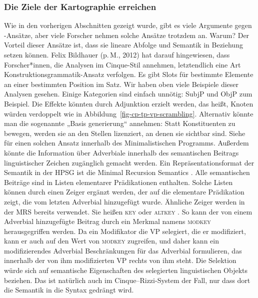 \subsubsection{Die Ziele der Kartographie erreichen}
\label{sec-Cinque-solution}

Wie in den vorherigen Abschnitten gezeigt wurde, gibt es viele Argumente gegen
\citeauthor{CR2010a}-Ansätze, aber viele Forscher nehmen solche Ansätze trotzdem an. Warum? Der
Vorteil dieser Ansätze ist, dass sie lineare Abfolge und Semantik in Beziehung setzen können. Felix
Bildhauer (p.\,M., 2012) hat darauf hingewiesen, dass Forscher*innen, die Analysen im Cinque-Stil
annehmen, letztendlich eine Art Konstruktionsgrammatik-Ansatz verfolgen. Es gibt Slots für bestimmte
Elemente an einer bestimmten Position im Satz. Wir haben 
oben viele Beispiele dieser Analysen gesehen. Einige Kategorien sind einfach unnötig: SubjP und ObjP zum
Beispiel. Die Effekte könnten durch Adjunktion erzielt werden, das heißt, Knoten würden verdoppelt wie in
Abbildung~\ref{fig-cp-tp-vp-scrambling}. Alternativ könnte man die sogenannte „Basis%
generierung`` annehmen: Statt Konstituenten zu bewegen, werden sie an den Stellen lizenziert, an denen sie sichtbar sind. Siehe
\citet{Fanselow2001a} für einen solchen Ansatz innerhalb des Minimalistischen Programms.
Außerdem könnte die Information über Adverbiale innerhalb des semantischen Beitrags
linguistischer Zeichen zugänglich gemacht werden. Ein Repräsentationsformat der Semantik in der HPSG
ist die Minimal Recursion Semantics \citep{CFPS2005a}. Alle semantischen Beiträge sind in Listen elementarer
Prädikationen enthalten. Solche Listen können durch einen Zeiger ergänzt werden, der auf die elementare Prädikation zeigt, die
vom letzten Adverbial hinzugefügt wurde. Ähnliche Zeiger werden in der MRS bereits verwendet. Sie heißen
\textsc{key} oder \textsc{altkey} \parencites[Abschnitt~3.7]{FBO2003a-u}[]{CFPS2005a}. So kann der von einem Adverbial hinzugefügte Beitrag durch ein
Merkmal namens \textsc{modkey} herausgegriffen werden. Da ein Modifikator die VP selegiert, die er modifiziert, kann er auch auf den Wert von \textsc{modkey} zugreifen, und daher kann ein
modifizierendes Adverbial Beschränkungen für das Adverbial formulieren, das innerhalb der von ihm modifizierten VP rechts von ihm
steht. Die Selektion würde sich auf semantische Eigenschaften des selegierten linguistischen
Objekts beziehen. Das ist natürlich auch im Cinque--Rizzi-System der Fall, nur dass dort die
Semantik in die Syntax gedrängt wird.%


